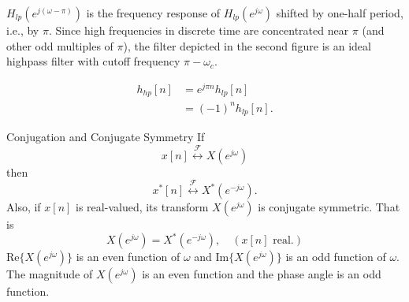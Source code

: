 \begin{frame}[plain]
    {
        \begin{figure}
            \centering
            
        \end{figure}

    }
    $H_{lp}(e^{j(\omega - \pi)})$ is the frequency response of $H_{lp}(e^{j\omega})$ shifted by one-half period, i.e., by $\pi$. Since high frequencies in discrete time are concentrated near $\pi$ (and other odd multiples of $\pi$), the filter depicted in the second figure is an ideal highpass filter with cutoff frequency $\pi - \omega_c$.

    \begin{align*}
        h_{hp}[n] &= e^{j\pi n}h_{lp}[n] \\
        &= (-1)^n h_{lp}[n].
    \end{align*}
\end{frame}

\begin{frame}{Conjugation and Conjugate Symmetry}
    If
    \begin{equation*}
        x[n] \overset{\mathcal{F}}{\leftrightarrow} X(e^{j\omega})
    \end{equation*}
    then
    \begin{equation*}
        x^\ast[n] \overset{\mathcal{F}}{\leftrightarrow} X^\ast(e^{-j\omega}).
    \end{equation*}
    Also, if $x[n]$ is real-valued, its transform $X(e^{j\omega})$ is conjugate symmetric. That is
    \begin{equation*}
        X(e^{j\omega}) = X^\ast(e^{-j\omega}), \quad (x[n] \text{ real}.)
    \end{equation*}
    $\mathrm{Re}\{X(e^{j\omega})\}$ is an even function of $\omega$ and  $\mathrm{Im}\{X(e^{j\omega})\}$ is an odd function of $\omega$.\\
    The magnitude of $X(e^{j\omega})$ is an even function and the phase angle is an odd function.
\end{frame}
%
%
%

